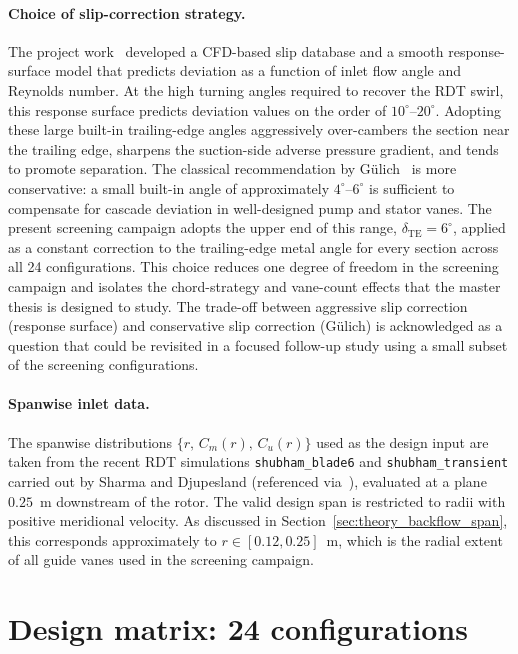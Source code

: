 \paragraph{Choice of slip-correction strategy.}
The project work~\cite{Leonsen2025} developed a CFD-based slip database and a smooth response-surface model that predicts deviation as a function of inlet flow angle and Reynolds number. At the high turning angles required to recover the RDT swirl, this response surface predicts deviation values on the order of $10^\circ$--$20^\circ$. Adopting these large built-in trailing-edge angles aggressively over-cambers the section near the trailing edge, sharpens the suction-side adverse pressure gradient, and tends to promote separation. The classical recommendation by G\"ulich~\cite{Gulich2010} is more conservative: a small built-in angle of approximately $4^\circ$--$6^\circ$ is sufficient to compensate for cascade deviation in well-designed pump and stator vanes. The present screening campaign adopts the upper end of this range, $\delta_{\mathrm{TE}} = 6^\circ$, applied as a constant correction to the trailing-edge metal angle for every section across all 24 configurations. This choice reduces one degree of freedom in the screening campaign and isolates the chord-strategy and vane-count effects that the master thesis is designed to study. The trade-off between aggressive slip correction (response surface) and conservative slip correction (G\"ulich) is acknowledged as a question that could be revisited in a focused follow-up study using a small subset of the screening configurations.
 
\paragraph{Spanwise inlet data.}
The spanwise distributions $\{r,\,C_m(r),\,C_u(r)\}$ used as the design input are taken from the recent RDT simulations \texttt{shubham\_blade6} and \texttt{shubham\_transient} carried out by Sharma and Djupesland (referenced via~\cite{Leonsen2025}), evaluated at a plane $0.25$~m downstream of the rotor. The valid design span is restricted to radii with positive meridional velocity. As discussed in Section~\ref{sec:theory_backflow_span}, this corresponds approximately to $r \in [0.12, 0.25]$~m, which is the radial extent of all guide vanes used in the screening campaign.
 
\section{Design matrix: 24 configurations}
\label{sec:methods_design_matrix}
 
